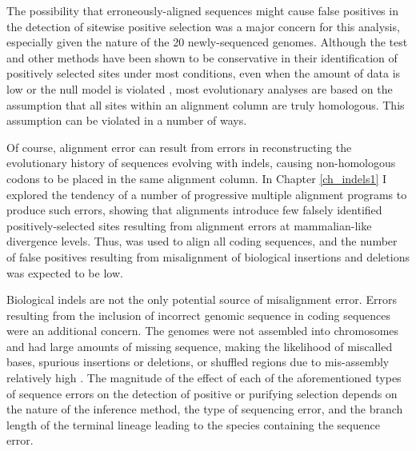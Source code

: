 The possibility that erroneously-aligned sequences might cause false
positives in the detection of sitewise positive selection was a major
concern for this analysis, especially given the \lcv nature of the 20
newly-sequenced genomes. Although the \slr test and other \sw \ml
methods have been shown to be conservative in their identification of
positively selected sites under most conditions, even when the amount
of data is low or the null model is violated
\citep{Anisimova2002,Anisimova2003,Massingham2005}, most evolutionary
analyses are based on the assumption that all sites within an
alignment column are truly homologous. This assumption can be violated
in a number of ways.

Of course, alignment error can result from errors in reconstructing
the evolutionary history of sequences evolving with indels, causing
non-homologous codons to be placed in the same alignment column. In
Chapter \ref{ch_indels1} I explored the tendency of a number of
progressive multiple alignment programs to produce such errors,
showing that \prankc alignments introduce few falsely identified
positively-selected sites resulting from alignment errors at
mammalian-like divergence levels. Thus, \prankc was used to align all
coding sequences, and the number of false positives resulting from
misalignment of biological insertions and deletions was expected to be
low.

Biological indels are not the only potential source of misalignment
error. Errors resulting from the inclusion of incorrect genomic
sequence in coding sequences were an additional concern. The \lcv
genomes were not assembled into chromosomes and had large amounts of
missing sequence, making the likelihood of miscalled bases, spurious
insertions or deletions, or shuffled regions due to mis-assembly
relatively high \citep{Green2007}. The magnitude of the effect of each
of the aforementioned types of sequence errors on the detection of
positive or purifying selection depends on the nature of the inference
method, the type of sequencing error, and the branch length of the
terminal lineage leading to the species containing the sequence error.

